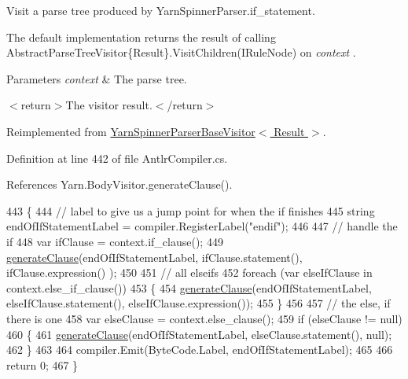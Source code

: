 Visit a parse tree produced by Yarn\-Spinner\-Parser.\-if\-\_\-statement. 

The default implementation returns the result of calling Abstract\-Parse\-Tree\-Visitor\{\-Result\}.\-Visit\-Children(\-I\-Rule\-Node) on {\itshape context} . 


\begin{DoxyParams}{Parameters}
{\em context} & The parse tree.\\
\hline
\end{DoxyParams}
$<$return$>$The visitor result.$<$/return$>$ 

Reimplemented from \hyperlink{a00199_a005f9655da52de2581762a4b61912ecd}{Yarn\-Spinner\-Parser\-Base\-Visitor$<$ Result $>$}.



Definition at line 442 of file Antlr\-Compiler.\-cs.



References Yarn.\-Body\-Visitor.\-generate\-Clause().


\begin{DoxyCode}
443         \{
444             \textcolor{comment}{// label to give us a jump point for when the if finishes}
445             \textcolor{keywordtype}{string} endOfIfStatementLabel = compiler.RegisterLabel(\textcolor{stringliteral}{"endif"});
446 
447             \textcolor{comment}{// handle the if}
448             var ifClause = context.if\_clause();
449             \hyperlink{a00046_a5f246aeaea2ba795d78abb0f8918cca4}{generateClause}(endOfIfStatementLabel, ifClause.statement(), ifClause.expression()
      );
450 
451             \textcolor{comment}{// all elseifs}
452             \textcolor{keywordflow}{foreach} (var elseIfClause \textcolor{keywordflow}{in} context.else\_if\_clause())
453             \{
454                 \hyperlink{a00046_a5f246aeaea2ba795d78abb0f8918cca4}{generateClause}(endOfIfStatementLabel, elseIfClause.statement(), 
      elseIfClause.expression());
455             \}
456 
457             \textcolor{comment}{// the else, if there is one}
458             var elseClause = context.else\_clause();
459             \textcolor{keywordflow}{if} (elseClause != null)
460             \{
461                 \hyperlink{a00046_a5f246aeaea2ba795d78abb0f8918cca4}{generateClause}(endOfIfStatementLabel, elseClause.statement(), null);
462             \}
463 
464             compiler.Emit(ByteCode.Label, endOfIfStatementLabel);
465 
466             \textcolor{keywordflow}{return} 0;
467         \}
\end{DoxyCode}


